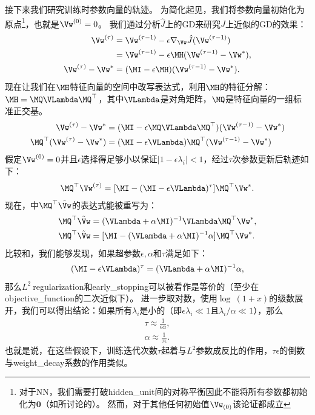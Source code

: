 接下来我们研究训练时参数向量的轨迹。
为简化起见，我们将参数向量初始化为原点\footnote{对于\gls{NN}，我们需要打破\gls{hidden_unit}间的对称平衡因此不能将所有参数都初始化为$\mathbf{0}$（如所讨论的）。
然而，对于其他任何初始值$\Vw_{(0)}$该论证都成立}，也就是$\Vw^{(0)} = 0$。
我们通过分析$\hat{J}$上的\gls{GD}来研究$J$上近似的\gls{GD}的效果：
\begin{align}
\Vw^{(\tau)} &= \Vw^{(\tau-1)} -\epsilon \nabla_{\Vw} \hat{J}( \Vw^{(\tau-1)} ) \\
&=  \Vw^{(\tau-1)}  - \epsilon  \MH ( \Vw^{(\tau-1)} -  \Vw^* ), \\
\Vw^{(\tau)}  -  \Vw^* &= (\MI - \epsilon  \MH) ( \Vw^{(\tau-1)} -  \Vw^* ).
 \end{align}
现在让我们在$\MH$特征向量的空间中改写表达式，利用$\MH$的特征分解：$\MH = \MQ \VLambda \MQ^\top$，其中$\VLambda$是对角矩阵，$\MQ$是特征向量的一组标准正交基。
\begin{align}
\Vw^{(\tau)}  -  \Vw^* &= (\MI - \epsilon \MQ \VLambda \MQ^\top) ( \Vw^{(\tau-1)} -  \Vw^* ) \\
\MQ^\top (\Vw^{(\tau)}  -  \Vw^*) &= (\MI - \epsilon \VLambda)\MQ^\top ( \Vw^{(\tau-1)} -  \Vw^* )
\end{align}
假定$\Vw^{(0)} = 0$并且$\epsilon$选择得足够小以保证$|1 - \epsilon \lambda_i |<1$，经过$\tau$次参数更新后轨迹如下：
\begin{align} \label{eq:740qw}
\MQ^\top  \Vw^{(\tau)} = [\MI - (\MI - \epsilon \VLambda)^\tau] \MQ^\top  \Vw^* .
\end{align}
现在，中$\MQ^\top \tilde \Vw$的表达式能被重写为：
\begin{align}
\MQ^\top  \tilde \Vw &= (\VLambda + \alpha \MI)^{-1} \VLambda \MQ^\top  \Vw^*, \\
\MQ^\top  \tilde \Vw &= [\MI - (\VLambda + \alpha \MI)^{-1} \alpha] \MQ^\top  \Vw^*. 
\label{eq:742qw}
\end{align}
比较和，我们能够发现，如果超参数$\epsilon,\alpha$和$\tau$满足如下：
\begin{align}
(\MI - \epsilon \VLambda)^\tau =  (\VLambda + \alpha \MI)^{-1} \alpha,
\end{align}
那么$L^2~$\gls{regularization}和\gls{early_stopping}可以被看作是等价的（至少在\gls{objective_function}的二次近似下）。
进一步取对数，使用$\log~(1+x)$的级数展开，我们可以得出结论：如果所有$\lambda_i$是小的（即$\epsilon \lambda_i \ll 1$且$\lambda_i / \alpha \ll 1$），那么
\begin{align}
\tau \approx \frac{1}{\epsilon \alpha}, \\
\alpha \approx \frac{1}{\tau \epsilon}.
\end{align}
也就是说，在这些假设下，训练迭代次数$\tau$起着与$L^2$参数成反比的作用，$\tau \epsilon$的倒数与\gls{weight_decay}系数的作用类似。

